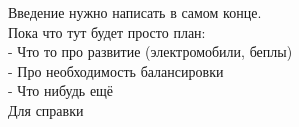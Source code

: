 


Введение нужно написать в самом конце. \\
Пока что тут будет просто план:        \\
- Что то про развитие (электромобили, беплы)  \\
- Про необходимость балансировки  \\
- Что нибудь ещё \\
Для справки
\begin{figure}[h]
\end{figure}

\newpage




